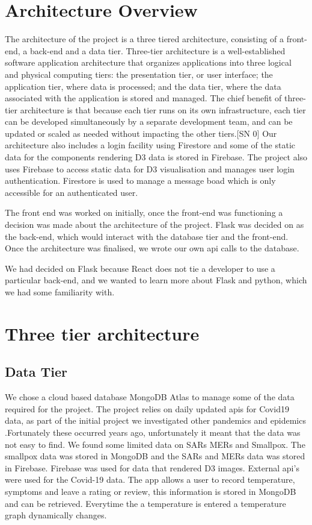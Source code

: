 \section{Architecture Overview}
The architecture of the project is a three tiered architecture, consisting of a front-end, a back-end and a data tier.
Three-tier architecture is a well-established software application architecture that organizes applications into three logical and physical computing tiers: the presentation tier, or user interface; the application tier, where data is processed; and the data tier, where the data associated with the application is stored and managed.
The chief benefit of three-tier architecture is that because each tier runs on its own infrastructure, each tier can be developed simultaneously by a separate development team, and can be updated or scaled as needed without impacting the other tiers.[SN 0]
Our architecture also includes a login facility using Firestore and some of the static data for the components rendering D3 data is stored in Firebase.
The project also uses Firebase to access static data for D3 visualisation and manages user login authentication. Firestore is used to manage a message boad which is only accessible for an authenticated user.


The front end was worked on initially, once the front-end was functioning a decision was made about the architecture of the project. Flask was decided on as the back-end, which would interact with the database tier and the front-end.
Once the architecture was finalised, we wrote our own api calls to the database.
 
We had decided on Flask because React does not tie a developer to use a particular back-end, and we wanted to learn more about Flask and python, which we had some familiarity with.



\section{Three tier architecture}
\subsection{Data Tier}
We chose a cloud based database MongoDB Atlas to manage some of the data required for the project. The project relies on daily updated apis for Covid19 data, as part of the initial project we investigated other pandemics and epidemics .Fortunately these occurred years ago, unfortunately it meant that the data was not easy to find. We found some limited data on SARs MERs and Smallpox. The smallpox data was stored in MongoDB and the SARs and MERs data was stored in Firebase.
Firebase was used for data that rendered D3 images. External api's were used for the Covid-19 data. The app allows a user to record temperature, symptoms and leave a rating or review, this information is stored in MongoDB and can be retrieved. Everytime the a temperature is entered a temperature graph dynamically changes.

